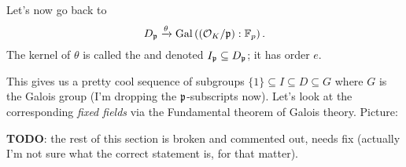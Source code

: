 Let's now go back to
\[ D_\mathfrak p \xrightarrow{\theta} \operatorname{Gal}\left( (\mathcal O_K/\mathfrak p) : \mathbb F_p \right). \]
The kernel of $\theta$ is called the 
and denoted $I_\mathfrak p \subseteq D_\mathfrak p$; it has order $e$.

This gives us a pretty cool sequence of subgroups
$\{1\} \subseteq I \subseteq D \subseteq G$
where $G$ is the Galois group (I'm dropping the $\mathfrak p$-subscripts now).
Let's look at the corresponding \emph{fixed fields} via the Fundamental theorem of Galois theory.
Picture:
\begin{center}
\end{center}

\textbf{TODO}:
the rest of this section is broken and commented out, needs fix
(actually I'm not sure what the correct statement is, for that matter).


